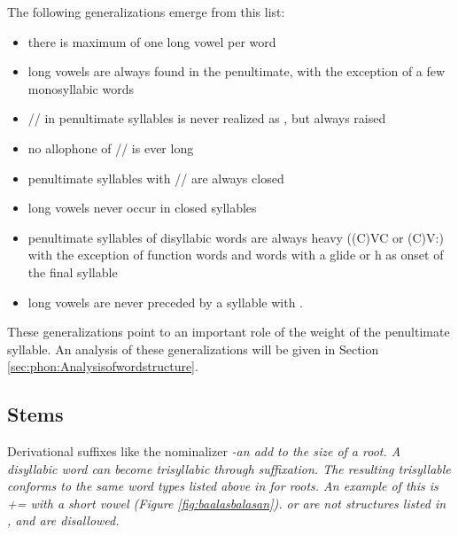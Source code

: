 The following generalizations emerge from this list:
\begin{itemize}
 \item there is maximum of one long vowel per word
 \item long vowels are always found in the penultimate, with the exception of a few monosyllabic words
\item /\E/ in penultimate syllables is never realized as , but always raised
\item no allophone of /\E/ is ever long
\item penultimate syllables with /\E/ are always closed
 \item long vowels never occur in closed syllables
 \item penultimate syllables of disyllabic words are always heavy ((C)VC or (C)V:) with the exception of function words and words with a glide or h as onset of the final syllable
 \item long vowels are never preceded by a syllable with .
\end{itemize}

These generalizations point to an important role of the weight of the penultimate syllable. An analysis of these generalizations will be given in Section \ref{sec:phon:Analysisofwordstructure}.

\subsection{Stems}\label{sec:phon:struct:Stems}
Derivational suffixes like the nominalizer \em -an \em add to the size of a root. A disyllabic word can become trisyllabic through suffixation. The resulting trisyllable conforms to the same word types listed above in  for roots.
An example of this is += with a short vowel (Figure \ref{fig:baalasbalasan}).  or  are not structures listed in , and are disallowed.

